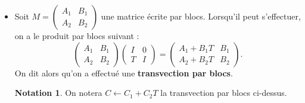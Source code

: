 \documentclass[french]{article}
\theoremstyle{plain}
\theoremstyle{definition}
\newtheorem*{notation}{Notation}
\theoremstyle{remark}
\begin{document}
\begin{itemize}
	\item Soit $M=\begin{pmatrix}
		A_1&B_1\\
		A_2&B_2
	\end{pmatrix}$ une matrice écrite par blocs. Lorsqu'il peut s'effectuer, on a le produit par blocs suivant :
	$$\begin{pmatrix}
		A_1&B_1\\
		A_2&B_2
	\end{pmatrix}\begin{pmatrix}
	I&0\\
	T&I
	\end{pmatrix}=\begin{pmatrix}
	A_1+B_1T&B_1\\
	A_2+B_2T&B_2
	\end{pmatrix}.$$
	On dit alors qu'on a effectué une \textbf{transvection par blocs}.
	
	\begin{notation}
		On notera $C\leftarrow C_1+C_2T$ la transvection par blocs ci-dessus.
	\end{notation}
	

\end{itemize}
\end{document}

